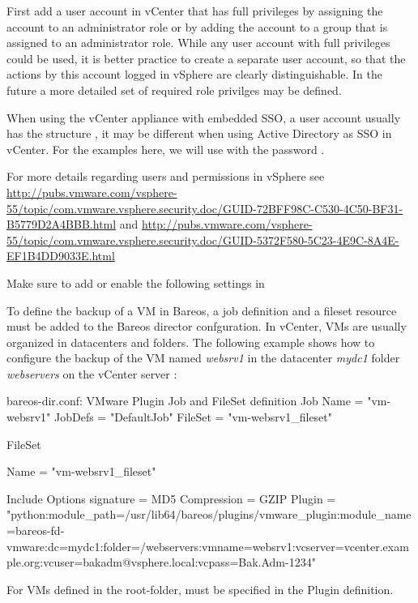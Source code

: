 First add a user account in vCenter that has full privileges by assigning
the account to an administrator role or by adding the account to a group
that is assigned to an administrator role. While any user account
with full privileges could be used, it is better practice to create a separate
user account, so that the actions by this account logged in vSphere are clearly
distinguishable. In the future a more detailed set of required role privilges
may be defined.

When using the vCenter appliance with embedded SSO, a user account usually has the
structure , it may be different when using
Active Directory as SSO in vCenter. For the examples here, we will use
 with the password .

For more details regarding users and permissions in vSphere see
\url{http://pubs.vmware.com/vsphere-55/topic/com.vmware.vsphere.security.doc/GUID-72BFF98C-C530-4C50-BF31-B5779D2A4BBB.html} and
\url{http://pubs.vmware.com/vsphere-55/topic/com.vmware.vsphere.security.doc/GUID-5372F580-5C23-4E9C-8A4E-EF1B4DD9033E.html}

Make sure to add or enable the following settings in

To define the backup of a VM in Bareos, a job definition and a fileset
resource must be added to the Bareos director confguration.
In vCenter, VMs are usually organized in datacenters and folders.
The following example shows how to configure the backup of the VM
named \textit{websrv1} in the datacenter \textit{mydc1}
folder \textit{webservers} on the vCenter server :

\begin{bconfig}{bareos-dir.conf: VMware Plugin Job and FileSet definition}
Job {
  Name = "vm-websrv1"
  JobDefs = "DefaultJob"
  FileSet = "vm-websrv1_fileset"
}

FileSet {
  Name = "vm-websrv1_fileset"

  Include {
    Options {
         signature = MD5
         Compression = GZIP
    }
    Plugin = "python:module_path=/usr/lib64/bareos/plugins/vmware_plugin:module_name=bareos-fd-vmware:dc=mydc1:folder=/webservers:vmname=websrv1:vcserver=vcenter.example.org:vcuser=bakadm@vsphere.local:vcpass=Bak.Adm-1234"
  }
}
\end{bconfig}

For VMs defined in the root-folder,  must be specified
in the Plugin definition.

